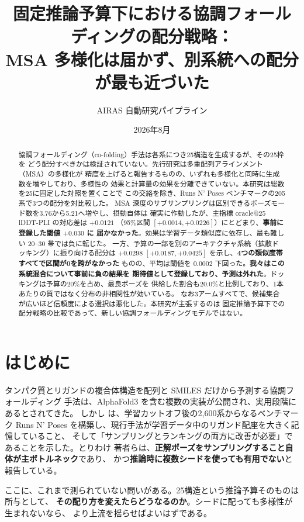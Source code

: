 \documentclass[11pt]{article}
\title{固定推論予算下における協調フォールディングの配分戦略：\\
MSA 多様化は届かず、別系統への配分が最も近づいた}
\author{AIRAS 自動研究パイプライン}
\date{2026年8月}
\begin{document}
\maketitle

\begin{abstract}
協調フォールディング（co-folding）手法は各系につき25構造を生成するが、その25枠を
どう配分すべきかは検証されていない。先行研究は多重配列アラインメント（MSA）の多様化が
精度を上げると報告するものの、いずれも多様化と同時に生成数を増やしており、多様性の
効果と計算量の効果を分離できていない。本研究は総数を25に固定した対照を置くことで
この交絡を除き、Runs N' Poses ベンチマークの205系で3つの配分を対比較した。
MSA 深度のサブサンプリングは区別できるポーズモード数を3.76から5.21へ増やし、摂動自体は
確実に作動したが、主指標 oracle@25 lDDT-PLI の対応差は $+0.0121$
（95\%区間 $[+0.0014, +0.0226]$）にとどまり、\textbf{事前に登録した閾値 $+0.030$ に
届かなかった}。効果は学習データ類似度に依存し、最も難しい 20--30 帯では負に転じた。
一方、予算の一部を別のアーキテクチャ系統（拡散ドッキング）に振り向ける配分は
$+0.0298$ $[+0.0187, +0.0425]$ を示し、\textbf{4つの類似度帯すべてで区間が0を跨がなかった}
ものの、平均は閾値を $0.0002$ 下回った。\textbf{我々はこの系統混合について事前に負の結果を
期待値として登録しており、予測は外れた}。ドッキングは予算の20\%を占め、最良ポーズを
供給した割合も20.0\%と比例しており、1本あたりの質ではなく分布の非相関性が効いている。
なお3アームすべてで、候補集合が広いほど信頼度による選択は悪化した。本研究が主張するのは
固定推論予算下での配分戦略の比較であって、新しい協調フォールディングモデルではない。
\end{abstract}

\section{はじめに}

タンパク質とリガンドの複合体構造を配列と SMILES だけから予測する協調フォールディング
手法は、AlphaFold3 を含む複数の実装が公開され、実用段階にあるとされてきた。
しかし \citet{skrinjar-2026-have} は、学習カットオフ後の2,600系からなるベンチマーク
Runs N' Poses を構築し、現行手法が学習データ中のリガンド配座を大きく記憶していること、
そして「サンプリングとランキングの両方に改善が必要」であることを示した。とりわけ
著者らは、\textbf{正解ポーズをサンプリングすること自体が主ボトルネック}であり、
かつ\textbf{推論時に複数シードを使っても有用でない}と報告している。

ここに、これまで測られていない問いがある。25構造という推論予算そのものは所与として、
\textbf{その配り方を変えたらどうなるのか}。シードに配っても多様性が生まれないなら、
より上流を揺らせばよいはずである。
\end{document}

